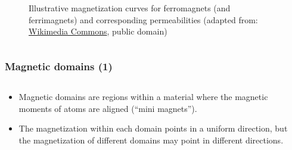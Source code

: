 \begin{frame}
\begin{columns}
\begin{column}{0.425\textwidth}
\begin{figure}
				\caption{Illustrative magnetization curves for ferromagnets (and ferrimagnets) and corresponding permeabilities  (adapted from: \href{https://commons.wikimedia.org/wiki/File:Permeability_of_ferromagnet_by_Zureks.svg}{Wikimedia Commons}, public domain)}
			\end{figure}
		\end{column}
		\end{columns}
\end{frame}


\begin{frame}
	\frametitle{Magnetic domains (1)}
    \begin{columns}
	\begin{column}{0.48\textwidth}
    \begin{itemize}
        \item Magnetic domains are regions within a material where the magnetic moments of atoms are aligned (``mini magnets'').
        \item The magnetization within each domain points in a uniform direction, but the magnetization of different domains may point in different directions.
    \end{itemize}
    \end{column}
    \hfill
    \begin{column}{0.52\textwidth}

\end{column}
\end{columns}
\end{frame}
